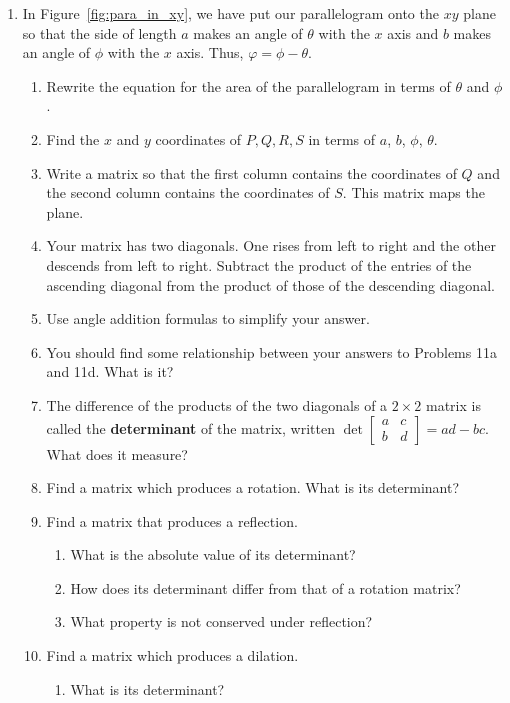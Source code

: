 \documentclass[../gatm.tex]{subfiles}
\begin{document}
\begin{enumerate}
\setcounter{enumi}{\value{problem_i}}
\item In Figure~\ref{fig:para_in_xy}, we have put our parallelogram onto the $xy$ plane so that the side of length $a$ makes an angle of $\theta$ with the $x$ axis and $b$ makes an angle of $\phi$ with the $x$ axis. Thus, $\varphi=\phi-\theta$.
\begin{enumerate}
\item Rewrite the equation for the area of the parallelogram in terms of $\theta$ and $\phi$.
\item Find the $x$ and $y$ coordinates of $P,Q,R,S$ in terms of $a$, $b$, $\phi$, $\theta$.
\item Write a matrix so that the first column contains the coordinates of $Q$ and the second column contains the coordinates of $S$. This matrix maps the plane.
\item Your matrix has two diagonals. One rises from left to right and the other descends from left to right. Subtract the product of the entries of the ascending diagonal from the product of those of the descending diagonal.
\item Use angle addition formulas to simplify your answer.
\item You should find some relationship between your answers to Problems 11a and 11d. What is it?
\item The difference of the products of the two diagonals of a $2\times 2$ matrix is called the \textbf{determinant} of the matrix, written $\det \left[\begin{array}{cc}a & c \\ b & d \end{array}\right]=ad-bc$. What does it measure?
\item Find a matrix which produces a rotation. What is its determinant?
\item Find a matrix that produces a reflection.
\begin{enumerate}
\item What is the absolute value of its determinant?
\item How does its determinant differ from that of a rotation matrix?
\item What property is not conserved under reflection?
\end{enumerate}
\item Find a matrix which produces a dilation.
\begin{enumerate}
\item What is its determinant?

\end{enumerate}
\end{enumerate}
\end{enumerate}
\end{document}
